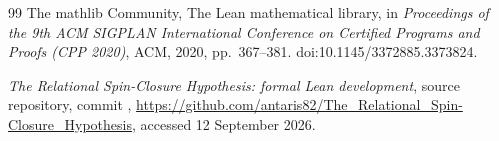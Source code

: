 \documentclass[11pt,a4paper]{article}
\theoremstyle{definition}
\theoremstyle{remark}
\begin{document}
\begin{thebibliography}{99}
The mathlib Community,
The Lean mathematical library,
in \emph{Proceedings of the 9th ACM SIGPLAN International Conference
on Certified Programs and Proofs (CPP 2020)},
ACM, 2020, pp.~367--381.
doi:10.1145/3372885.3373824.

{\raggedright
\emph{The Relational Spin-Closure Hypothesis: formal Lean development},
source repository, commit
,
\url{https://github.com/antaris82/The_Relational_Spin-Closure_Hypothesis},
accessed 12 September 2026.\par}

\end{thebibliography}
\end{document}

